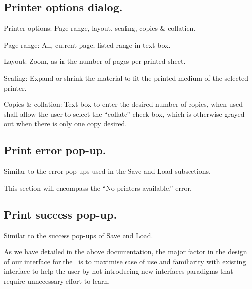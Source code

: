 \subsection{Printer options dialog.}

Printer options: Page range, layout, scaling, copies \& collation.

Page range: All, current page, listed range in text box.

Layout: Zoom, as in the number of pages per printed sheet.

Scaling: Expand or shrink the material to fit the printed medium of the selected printer.

Copies \& collation: Text box to enter the desired number of copies, when used shall allow the user to select the ``collate'' check box, which is otherwise grayed out when there is only one copy desired.

\subsection{Print error pop-up.}

Similar to the error pop-ups used in the Save and Load subsections.

This section will encompass the ``No printers available.'' error.

\subsection{Print success pop-up.}

Similar to the success pop-ups of Save and Load.


As we have detailed in the above documentation, the major factor in the design of our interface for the \iDesk\ is to maximise ease of use and familiarity with existing interface to help the user by not introducing new interfaces paradigms that require unnecessary effort to learn.

\bye
